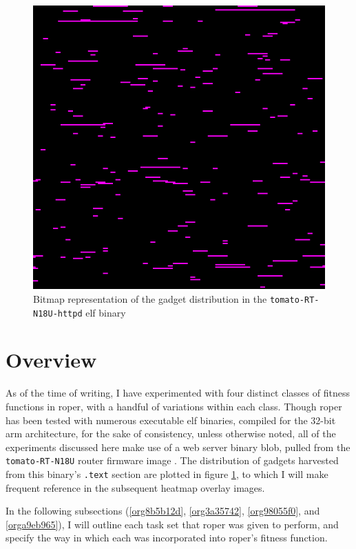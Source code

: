 \documentclass[12pt,glossary]{dalthesis}
\begin{document}
\begin{figure}[htbp]
\centering
\includegraphics[width=.9\linewidth]{../images/tomato-RT-N18U-httpd_heatmap.png}
\caption{\label{fig:orgec9e4ce}
Bitmap representation of the gadget distribution in the \texttt{tomato-RT-N18U-httpd} \gls{elf} binary}
\end{figure}

\section{Overview}
\label{sec:orgf7e061b}
\label{org5808f46}

As of the time of writing, I have experimented with four distinct classes of
fitness functions in \gls{roper}, with a handful of variations within each class.
Though \gls{roper} has been tested with numerous executable \gls{elf} binaries,
compiled for the 32-bit \gls{arm} architecture, for the sake of consistency, 
unless otherwise noted, all of the experiments discussed here make use of
a web server binary blob, pulled from the \texttt{tomato-RT-N18U} router firmware
image \cite{tomato-RT-N18U}. The distribution of gadgets harvested from this
binary's \texttt{.text} section are plotted in figure \ref{fig:orgec9e4ce}, to which
I will make frequent reference in the subsequent heatmap overlay images.

In the following subsections (\ref{org8b5b12d}, \ref{org3a35742},
\ref{org98055f0}, and \ref{orga9eb965}), I will outline each task set that
\gls{roper} was given to perform, and specify the way in which each was
incorporated into \gls{roper}'s fitness function.
\end{document}

